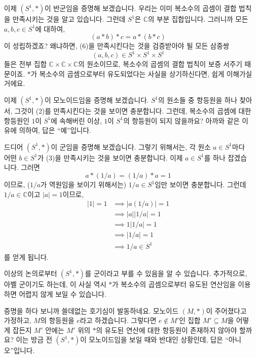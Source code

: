 \documentclass[12pt]{paper}
\begin{document}
  이제 $\left( S^1 , * \right)$이 반군임을 증명해 보겠습니다.
  우리는 이미 복소수의 곱셈이 결합 법칙을 만족시키는 것을 알고 있습니다.
  그런데 $S^1$은 $\mathbb{C}$의 부분 집합입니다.
  그러니까 모든 $a , b , c \in S^1$에 대하여, 
  \begin{equation*}
    (a * b) * c = a * (b * c) \tag{6}
  \end{equation*}
  이 성립하겠죠?
  왜냐하면, (6)을 만족시킨다는 것을 검증받아야 될 모든 삼중쌍 $$ \left( a , b , c \right) \in S^1 \times S^1 \times S^1 $$들은
  전부 집합 $\mathbb{C} \times \mathbb{C} \times \mathbb{C}$의 원소이므로,
  복소수의 곱셈의 결합 법칙이 보증 서주기 때문이죠.
  $*$가 복소수의 곱셈으로부터 유도되었다는 사실을 상기하신다면,
  쉽게 이해가실 거에요.

  이제 $\left( S^1 , * \right)$이 모노이드임을 증명해 보겠습니다.
  $S^1$의 원소들 중 항등원을 하나 찾아서, 그것이 (2)를 만족시킨다는 것을 보이면 충분합니다.
  그런데, 복소수의 곱셈에 대한 항등원인 $1$이 $S^1$에 속해버린 이상, $1$이 $S^1$의 항등원이 되지 않을까요?
  아까와 같은 이유에 의하여, 답은 ``예''입니다.

  드디어 $\left( S^1 , * \right)$이 군임을 증명해 보겠습니다.
  그렇기 위해서는, 각 원소 $a \in S^1$마다 어떤 $b \in S^1$가 (3)을 만족시키는 것을 보이면 충분합니다.
  이제 $a \in S^1$를 하나 잡겠습니다.
  그러면 $$ a * \left( 1 / a \right) = \left( 1 / a \right) * a = 1 $$이므로,
  ($1 / a$가 역원임을 보이기 위해서는) $1 / a \in S^1$임만 보이면 충분합니다.
  그런데 $1 / a \in \mathbb{C}$이고 $\left| a \right| = 1$이므로,
  \begin{align*}
    \left| 1 \right| = 1 
    & \implies \left| a \left( 1 / a \right) \right| = 1 \\
    & \implies \left| a \right| \left| 1 / a \right| = 1 \\
    & \implies 1 \left| 1 / a \right| = 1 \\
    & \implies \left| 1 / a \right| = 1 \\
    & \implies 1 / a \in S^1
  \end{align*}
  를 얻게 됩니다.

  이상의 논의로부터 $\left( S^1 , * \right)$를 군이라고 부를 수 있음을 알 수 있습니다.
  추가적으로, 아벨 군이기도 하는데,
  이 사실 역시 $*$가 복소수의 곱셈으로부터 유도된 연산임을 이용하면 어렵지 않게 보일 수 있습니다.

  증명을 하다 보니까 쓸데없는 호기심이 발동하네요.
  모노이드 $\left( M , * \right)$이 주어졌다고 가정하고, $M$의 항등원을 $e$라고 하겠습니다.
  그렇다면 $e \notin M'$인 집합 $M' \subseteq M$을 어떻게 잡든지 $M'$ 안에는 $M'$ 위의 $*$의 유도된 연산에 대한 항등원이 존재하지 않아야 할까요?
  이는 방금 전 $\left( S^1 , * \right)$이 모노이드임을 보일 때와 반대인 상황인데, 답은 ``아니오''입니다.
\end{document}
